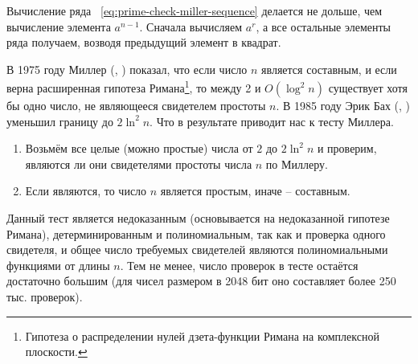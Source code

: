 Вычисление ряда ~\ref{eq:prime-check-miller-sequence} делается не дольше, чем вычисление элемента $a^{n-1}$. Сначала вычисляем $a^{r}$, а все остальные элементы ряда получаем, возводя предыдущий элемент в квадрат.

В 1975 году Миллер (, \cite{Miller:1975, Miller:1976}) показал, что если число $n$ является составным, и если верна расширенная гипотеза Римана\footnote{Гипотеза о распределении нулей дзета-функции Римана на комплексной плоскости.}, то между 2 и $O \left( \log^2 n \right)$ существует хотя бы одно число, не являющееся свидетелем простоты $n$. В 1985 году Эрик Бах (, \cite{Bach:1990}) уменьшил границу до $2 \ln^2 n$. Что в результате приводит нас к тесту Миллера.

\begin{enumerate}
	\item Возьмём все целые (можно простые) числа от $2$ до $2 \ln^2 n$ и проверим, являются ли они свидетелями простоты числа $n$ по Миллеру.
	\item Если являются, то число $n$ является простым, иначе -- составным.
\end{enumerate}

Данный тест является недоказанным (основывается на недоказанной гипотезе Римана), детерминированным и полиномиальным, так как и проверка одного свидетеля, и общее число требуемых свидетелей являются полиномиальными функциями от длины $n$. Тем не менее, число проверок в тесте остаётся достаточно большим (для чисел размером в 2048 бит оно составляет более 250 тыс. проверок).

